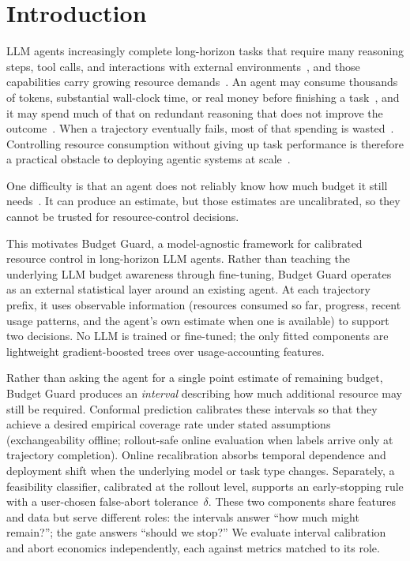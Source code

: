 \documentclass{article}
\begin{document}
\section{Introduction}
\label{sec:intro}

LLM agents increasingly complete long-horizon tasks that require many reasoning steps, tool calls, and interactions with external environments~\cite{kwa2025measuring}, and those capabilities carry growing resource demands~\cite{chen2026token}. An agent may consume thousands of tokens, substantial wall-clock time, or real money before finishing a task~\cite{bai2026how}, and it may spend much of that on redundant reasoning that does not improve the outcome~\cite{sui2025stop,wang2025harnessing,yue2025dont}. When a trajectory eventually fails, most of that spending is wasted~\cite{bai2026how}. Controlling resource consumption without giving up task performance is therefore a practical obstacle to deploying agentic systems at scale~\cite{chen2024frugalgpt,zellinger2025cost,davidov2026knowing}.

One difficulty is that an agent does not reliably know how much budget it still needs~\cite{bai2026how}. It can produce an estimate, but those estimates are uncalibrated, so they cannot be trusted for resource-control decisions.

This motivates Budget Guard, a model-agnostic framework for calibrated resource control in long-horizon LLM agents. Rather than teaching the underlying LLM budget awareness through fine-tuning, Budget Guard operates as an external statistical layer around an existing agent. At each trajectory prefix, it uses observable information (resources consumed so far, progress, recent usage patterns, and the agent's own estimate when one is available) to support two decisions. No LLM is trained or fine-tuned; the only fitted components are lightweight gradient-boosted trees over usage-accounting features.

Rather than asking the agent for a single point estimate of remaining budget, Budget Guard produces an \emph{interval} describing how much additional resource may still be required. Conformal prediction calibrates these intervals so that they achieve a desired empirical coverage rate under stated assumptions (exchangeability offline; rollout-safe online evaluation when labels arrive only at trajectory completion). Online recalibration absorbs temporal dependence and deployment shift when the underlying model or task type changes. Separately, a feasibility classifier, calibrated at the rollout level, supports an early-stopping rule with a user-chosen false-abort tolerance~$\delta$. These two components share features and data but serve different roles: the intervals answer ``how much might remain?''; the gate answers ``should we stop?'' We evaluate interval calibration and abort economics independently, each against metrics matched to its role.
\end{document}
